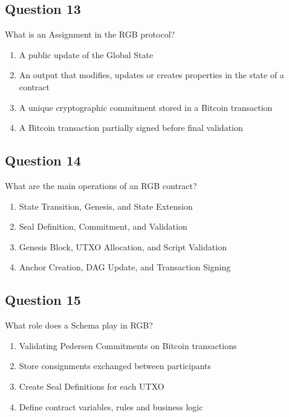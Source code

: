 \documentclass[12pt,a4paper]{article}
\begin{document}
\bigskip


\subsection*{Question 13}
What is an Assignment in the RGB protocol?

\begin{enumerate}[label=\Alph*., leftmargin=*]
\item A public update of the Global State
\item An output that modifies, updates or creates properties in the state of a contract
\item A unique cryptographic commitment stored in a Bitcoin transaction
\item A Bitcoin transaction partially signed before final validation
\end{enumerate}

\bigskip


\subsection*{Question 14}
What are the main operations of an RGB contract?

\begin{enumerate}[label=\Alph*., leftmargin=*]
\item State Transition, Genesis, and State Extension
\item Seal Definition, Commitment, and Validation
\item Genesis Block, UTXO Allocation, and Script Validation
\item Anchor Creation, DAG Update, and Transaction Signing
\end{enumerate}

\bigskip


\subsection*{Question 15}
What role does a Schema play in RGB?

\begin{enumerate}[label=\Alph*., leftmargin=*]
\item Validating Pedersen Commitments on Bitcoin transactions
\item Store consignments exchanged between participants
\item Create Seal Definitions for each UTXO
\item Define contract variables, rules and business logic
\end{enumerate}
\end{document}
